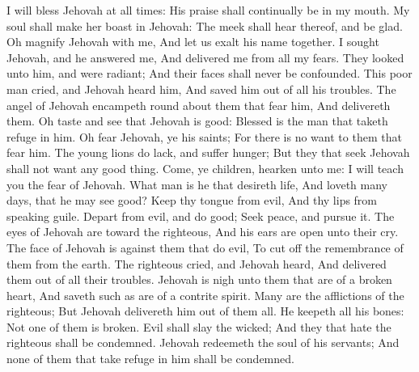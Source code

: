 I will bless Jehovah at all times: His praise shall continually be in my mouth.  My soul shall make her boast in Jehovah: The meek shall hear thereof, and be glad.  Oh magnify Jehovah with me, And let us exalt his name together.  I sought Jehovah, and he answered me, And delivered me from all my fears.  They looked unto him, and were radiant; And their faces shall never be confounded.  This poor man cried, and Jehovah heard him, And saved him out of all his troubles.  The angel of Jehovah encampeth round about them that fear him, And delivereth them.  Oh taste and see that Jehovah is good: Blessed is the man that taketh refuge in him.  Oh fear Jehovah, ye his saints; For there is no want to them that fear him.  The young lions do lack, and suffer hunger; But they that seek Jehovah shall not want any good thing.  Come, ye children, hearken unto me: I will teach you the fear of Jehovah.  What man is he that desireth life, And loveth many days, that he may see good?  Keep thy tongue from evil, And thy lips from speaking guile.  Depart from evil, and do good; Seek peace, and pursue it.  The eyes of Jehovah are toward the righteous, And his ears are open unto their cry.  The face of Jehovah is against them that do evil, To cut off the remembrance of them from the earth.  The righteous cried, and Jehovah heard, And delivered them out of all their troubles.  Jehovah is nigh unto them that are of a broken heart, And saveth such as are of a contrite spirit.  Many are the afflictions of the righteous; But Jehovah delivereth him out of them all.  He keepeth all his bones: Not one of them is broken.  Evil shall slay the wicked; And they that hate the righteous shall be condemned.  Jehovah redeemeth the soul of his servants; And none of them that take refuge in him shall be condemned. 

